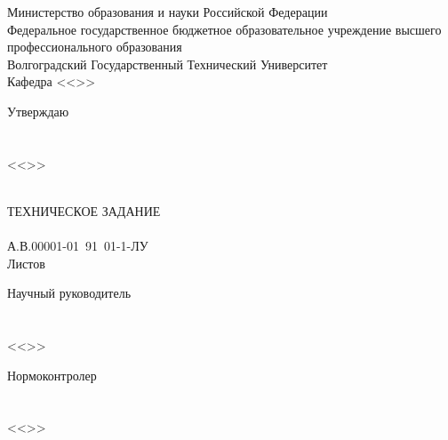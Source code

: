 {{
\sloppy
\clearpage
\thispagestyle{empty}
\begin{center}
Министерство образования и науки Российской Федерации\\
Федеральное государственное бюджетное образовательное учреждение высшего профессионального образования\\
Волгоградский Государственный Технический Университет\\
Кафедра <<\VSTUDepartment>>\\
\end{center}
\vfill
\hfill
\begin{minipage}[c]{18em}
Утверждаю\\
\VSTUHeadOfDepartmentPost\\
\makebox[2cm]{\hrulefill}\VSTUHeadOfDepartmentDegree~\VSTUHeadOfDepartmentName\\
<<\makebox[1.5cm]{\hrulefill}>>\makebox[3.5cm]{\hrulefill}\the\year
\end{minipage}
\vspace{8mm}
\begin{center}
\VSTUTitle\\
\vspace{8mm}
ТЕХНИЧЕСКОЕ ЗАДАНИЕ\\
\VSTUDocumentCode{}\\
А.В.00001-01\ 91\ 01-1-ЛУ\\
Листов \totalpages\\
\vfill
\end{center}
\begin{flushright}
\begin{minipage}[c]{15em}
Научный руководитель\\
\VSTUDirectorDegree{}\\
\makebox[2cm]{\hrulefill}\VSTUDirectorName\\
<<\makebox[1.5cm]{\hrulefill}>>\makebox[3.5cm]{\hrulefill}\the\year
\end{minipage}
\end{flushright}
\vspace{8mm}
\begin{flushleft}
\begin{minipage}[c]{15em}
Нормоконтролер\\
\VSTUStandardsAdviserDegree\\
\makebox[2cm]{\hrulefill}\VSTUStandardsAdviserName\\
<<\makebox[1.5cm]{\hrulefill}>>\makebox[3.5cm]{\hrulefill}\the\year
\end{minipage}

\end{flushleft}}}
